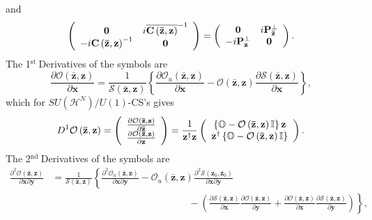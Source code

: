 \documentclass[aps,preprint]{revtex4}%
\begin{document}
and
\begin{equation}
\left(
\begin{array}
[c]{cc}%
\mathbf{0} & i\overline{\mathbf{C}\left(  \mathbf{\bar{z},z}\right)  }^{-1}\\
-i\mathbf{C}\left(  \mathbf{\bar{z},z}\right)  ^{-1} & \mathbf{0}%
\end{array}
\right)  =\left(
\begin{array}
[c]{cc}%
\mathbf{0} & i\mathbf{P}_{\mathbf{\bar{z}}}^{\bot}\\
-i\mathbf{P}_{\mathbf{z}}^{\bot} & \mathbf{0}%
\end{array}
\right)  .
\end{equation}
The 1$^{\text{st }}$Derivatives of the symbols are
\begin{equation}
\frac{\partial\mathcal{O}\left(  \mathbf{\bar{z},z}\right)  }{\partial
\mathbf{x}}=\frac{1}{\mathcal{S}\left(  \mathbf{\bar{z},z}\right)  }\left\{
\frac{\partial\mathcal{O}_{u}\left(  \mathbf{\bar{z},z}\right)  }%
{\partial\mathbf{x}}-\mathcal{O}\left(  \mathbf{\bar{z},z}\right)
\frac{\partial\mathcal{S}\left(  \mathbf{\bar{z},z}\right)  }{\partial
\mathbf{x}}\right\}  ,
\end{equation}
which for $SU\left(  \mathcal{H}^{N}\right)  /U\left(  1\right)  $-CS's gives%
\begin{equation}
D^{1}\mathcal{O}\left(  \mathbf{\bar{z},z}\right)  =\left(
\begin{array}
[c]{c}%
\frac{\partial\mathcal{O}\left(  \mathbf{\bar{z},z}\right)  }{\partial
\mathbf{\bar{z}}}\\
\frac{\partial\mathcal{O}\left(  \mathbf{\bar{z},z}\right)  }{\partial
\mathbf{z}}%
\end{array}
\right)  =\frac{1}{\mathbf{z}^{\dagger}\mathbf{z}}\left(
\begin{array}
[c]{c}%
\left\{  \mathbb{O}-\mathcal{O}\left(  \mathbf{\bar{z},z}\right)
\mathbb{I}\right\}  \mathbf{z}\\
\mathbf{z}^{\dagger}\left\{  \mathbb{O}-\mathcal{O}\left(  \mathbf{\bar{z}%
,z}\right)  \mathbb{I}\right\}
\end{array}
\right)  .
\end{equation}
The 2$^{\text{nd }}$Derivatives of the symbols are
\begin{align}
\frac{\partial^{2}\mathcal{O}\left(  \mathbf{\bar{z},z}\right)  }%
{\partial\mathbf{x}\partial\mathbf{y}} &  =\frac{1}{\mathcal{S}\left(
\mathbf{\bar{z},z}\right)  }\left\{  \frac{\partial^{2}\mathcal{O}_{u}\left(
\mathbf{\bar{z},z}\right)  }{\partial\mathbf{x}\partial\mathbf{y}}%
-\mathcal{O}_{u}\left(  \mathbf{\bar{z},z}\right)  \frac{\partial
^{2}\mathcal{S}\left(  \mathbf{z}_{0},\mathbf{\bar{z}}_{0}\right)  }%
{\partial\mathbf{x}\partial\mathbf{y}}\right.  \nonumber\\
&  \qquad\qquad\qquad\qquad\qquad\qquad\qquad-\left.  \left(  \frac
{\partial\mathcal{S}\left(  \mathbf{\bar{z},z}\right)  }{\partial\mathbf{x}%
}\frac{\partial\mathcal{O}\left(  \mathbf{\bar{z},z}\right)  }{\partial
\mathbf{y}}+\frac{\partial\mathcal{O}\left(  \mathbf{\bar{z},z}\right)
}{\partial\mathbf{x}}\frac{\partial\mathcal{S}\left(  \mathbf{\bar{z}%
,z}\right)  }{\partial\mathbf{y}}\right)  \right\}  ,
\end{align}
\end{document}
